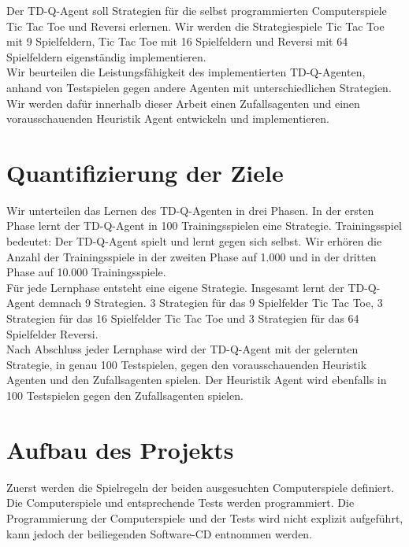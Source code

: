 Der TD-Q-Agent soll Strategien für die selbst programmierten Computerspiele Tic Tac Toe und Reversi erlernen. Wir werden die Strategiespiele Tic Tac Toe mit 9 Spielfeldern, Tic Tac Toe mit 16 Spielfeldern und Reversi mit 64 Spielfeldern eigenständig implementieren. \\

Wir beurteilen die Leistungsfähigkeit des implementierten TD-Q-Agenten, anhand von Testspielen gegen andere Agenten mit unterschiedlichen Strategien. Wir werden dafür innerhalb dieser Arbeit einen Zufallsagenten und einen vorausschauenden Heuristik Agent entwickeln und implementieren. \\

\section{Quantifizierung der Ziele}
\label{sec:Quantifizierung der Ziele}

Wir unterteilen das Lernen des TD-Q-Agenten in drei Phasen. In der ersten Phase lernt der TD-Q-Agent in 100 Trainingsspielen eine Strategie. Trainingsspiel bedeutet: Der TD-Q-Agent spielt und lernt gegen sich selbst. Wir erhören die Anzahl der Trainingsspiele in der zweiten Phase auf 1.000 und in der dritten Phase auf 10.000 Trainingsspiele. \\

Für jede Lernphase entsteht eine eigene Strategie. Insgesamt lernt der TD-Q-Agent demnach 9 Strategien. 3 Strategien für das 9 Spielfelder Tic Tac Toe, 3 Strategien für das 16 Spielfelder Tic Tac Toe und 3 Strategien für das 64 Spielfelder Reversi. \\

Nach Abschluss jeder Lernphase wird der TD-Q-Agent mit der gelernten Strategie, in genau 100 Testspielen, gegen den vorausschauenden Heuristik Agenten und den Zufallsagenten spielen. Der Heuristik Agent wird ebenfalls in 100 Testspielen gegen den Zufallsagenten spielen. \\

\section{Aufbau des Projekts}
Zuerst werden die Spielregeln der beiden ausgesuchten Computerspiele definiert. Die Computerspiele und entsprechende Tests werden programmiert. Die Programmierung der Computerspiele und der Tests wird nicht explizit aufgeführt, kann jedoch der beiliegenden Software-CD entnommen werden. \\

